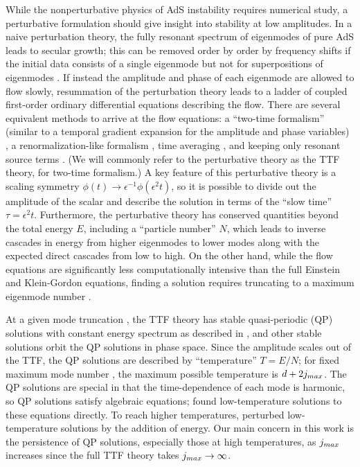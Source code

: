 \documentclass[../PhD.tex]{subfiles}
\begin{document}
While the nonperturbative physics of AdS instability requires numerical study, a perturbative formulation should give insight into stability at low amplitudes.  In a naive perturbation theory, the fully resonant spectrum of eigenmodes of pure AdS leads to secular growth; this can be removed order by order by frequency shifts if the initial data consists of a single eigenmode but not for superpositions of eigenmodes \cite{1109.1825}.  If instead the amplitude and phase of each eigenmode are allowed to flow slowly, resummation of the perturbation theory leads to a ladder of coupled first-order ordinary differential equations describing the flow.  There are several equivalent methods to arrive at the flow equations: a ``two-time formalism'' (similar to a temporal gradient expansion for the amplitude and phase variables) \cite{1403.6471}, a renormalization-like formalism \cite{1407.6273,1412.3249}, time averaging \cite{1412.3249,1510.07836}, and keeping only resonant source terms \cite{1506.03519}.  (We will commonly refer to the perturbative theory as the TTF theory, for two-time formalism.)  A key feature of this perturbative theory is a scaling symmetry $\phi(t)\to \epsilon^{-1}\phi(\epsilon^2 t)$, so it is possible to divide out the amplitude of the scalar and describe the solution in terms of the ``slow time'' $\tau=\epsilon^2 t$.  Furthermore, the perturbative theory has conserved quantities beyond the total energy $E$, including a ``particle number'' $N$, which leads to inverse cascades in energy from higher eigenmodes to lower modes along with the expected direct cascades from low to high.  On the other hand, while the flow equations are significantly less computationally intensive than the full Einstein and Klein-Gordon equations, finding a solution requires truncating to a maximum eigenmode number \jm.

At a given mode truncation \jm, the TTF theory has stable quasi-periodic (QP) solutions with constant energy spectrum as described in \cite{1403.6471,1507.08261}, and other stable solutions orbit the QP solutions in phase space.  Since the amplitude scales out of the TTF, the QP solutions are described by ``temperature'' $T=E/N$; for fixed maximum mode number \jm, the maximum possible temperature is $d+2j_{max}$. The QP solutions are special in that the time-dependence of each mode is harmonic, so QP solutions satisfy algebraic equations; \cite{1507.08261} found low-temperature solutions to these equations directly.  To reach higher temperatures, \cite{1507.08261} perturbed low-temperature solutions by the addition of energy.  Our main concern in this work is the persistence of QP solutions, especially those at high temperatures, as $j_{max}$ increases since the full TTF theory takes $j_{max}\to\infty$.
\end{document}
